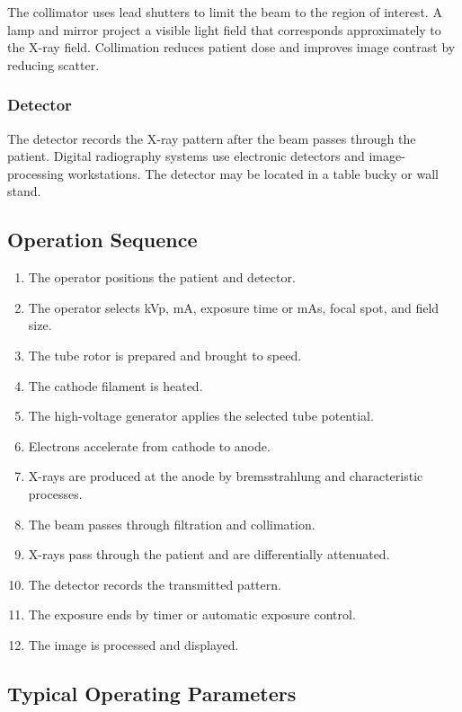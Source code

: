 \documentclass[12pt]{article}
\begin{document}
The collimator uses lead shutters to limit the beam to the region of interest. A lamp and mirror project a visible light field that corresponds approximately to the X-ray field. Collimation reduces patient dose and improves image contrast by reducing scatter.

\subsubsection{Detector}

The detector records the X-ray pattern after the beam passes through the patient. Digital radiography systems use electronic detectors and image-processing workstations. The detector may be located in a table bucky or wall stand.

\subsection{Operation Sequence}

\begin{enumerate}[label=\arabic*.]
    \item The operator positions the patient and detector.
    \item The operator selects kVp, mA, exposure time or mAs, focal spot, and field size.
    \item The tube rotor is prepared and brought to speed.
    \item The cathode filament is heated.
    \item The high-voltage generator applies the selected tube potential.
    \item Electrons accelerate from cathode to anode.
    \item X-rays are produced at the anode by bremsstrahlung and characteristic processes.
    \item The beam passes through filtration and collimation.
    \item X-rays pass through the patient and are differentially attenuated.
    \item The detector records the transmitted pattern.
    \item The exposure ends by timer or automatic exposure control.
    \item The image is processed and displayed.
\end{enumerate}

\subsection{Typical Operating Parameters}
\end{document}
